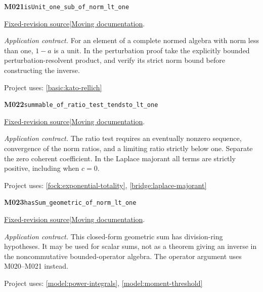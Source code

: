 \documentclass[11pt,a4paper]{article}
\theoremstyle{definition}
\theoremstyle{remark}
\begin{document}
\noindent\textbf{M021}\label{base:M021}\quad\nolinkurl{isUnit_one_sub_of_norm_lt_one}

\href{https://github.com/leanprover-community/mathlib4/blob/9bac2d0692944a775113f7c130fd5e5b4608a854/Mathlib/Analysis/SpecificLimits/Normed.lean}{Fixed-revision source}\quad|\quad\href{https://leanprover-community.github.io/mathlib4_docs/Mathlib/Analysis/SpecificLimits/Normed.html#isUnit_one_sub_of_norm_lt_one}{Moving documentation}.\par
\noindent\textit{Application contract.} For an element of a complete normed algebra with norm less than one, $1-a$ is a unit. In the perturbation proof take the explicitly bounded perturbation-resolvent product, and verify its strict norm bound before constructing the inverse.\par
{\small Project uses: \ref{basic:kato-rellich}}\par\medskip

\noindent\textbf{M022}\label{base:M022}\quad\nolinkurl{summable_of_ratio_test_tendsto_lt_one}

\href{https://github.com/leanprover-community/mathlib4/blob/9bac2d0692944a775113f7c130fd5e5b4608a854/Mathlib/Analysis/SpecificLimits/Normed.lean}{Fixed-revision source}\quad|\quad\href{https://leanprover-community.github.io/mathlib4_docs/Mathlib/Analysis/SpecificLimits/Normed.html#summable_of_ratio_test_tendsto_lt_one}{Moving documentation}.\par
\noindent\textit{Application contract.} The ratio test requires an eventually nonzero sequence, convergence of the norm ratios, and a limiting ratio strictly below one. Separate the zero coherent coefficient. In the Laplace majorant all terms are strictly positive, including when $c=0$.\par
{\small Project uses: \ref{fock:exponential-totality}, \ref{bridge:laplace-majorant}}\par\medskip

\noindent\textbf{M023}\label{base:M023}\quad\nolinkurl{hasSum_geometric_of_norm_lt_one}

\href{https://github.com/leanprover-community/mathlib4/blob/9bac2d0692944a775113f7c130fd5e5b4608a854/Mathlib/Analysis/SpecificLimits/Normed.lean}{Fixed-revision source}\quad|\quad\href{https://leanprover-community.github.io/mathlib4_docs/Mathlib/Analysis/SpecificLimits/Normed.html#hasSum_geometric_of_norm_lt_one}{Moving documentation}.\par
\noindent\textit{Application contract.} This closed-form geometric sum has division-ring hypotheses. It may be used for scalar sums, not as a theorem giving an inverse in the noncommutative bounded-operator algebra. The operator argument uses M020--M021 instead.\par
{\small Project uses: \ref{model:power-integrals}, \ref{model:moment-threshold}}\par\medskip
\end{document}
